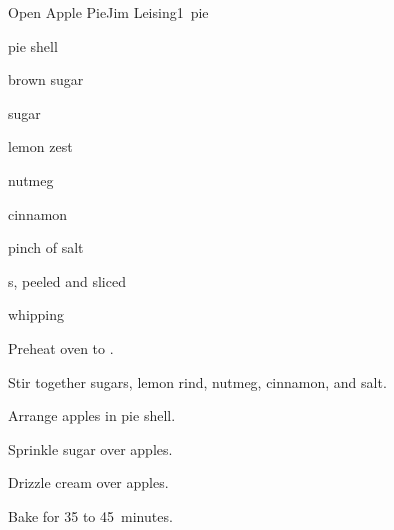 \begin{recipe}{Open Apple Pie}{Jim Leising}{1~pie}

\begin{ingredients}
\item pie shell
\item \C{\half} brown sugar
\item \C{\half} sugar
\item {} lemon zest
\item \tp{\half} nutmeg
\item \tp{\half} cinnamon
\item pinch of salt
\item {} s, peeled and sliced
\item \C{\third} whipping 
\end{ingredients}

\begin{directions}
\item Preheat oven to .
\item Stir together sugars, lemon rind, nutmeg, cinnamon, and salt.
\item Arrange apples in pie shell.
\item Sprinkle sugar over apples.
\item Drizzle cream over apples.
\item Bake for 35 to 45~minutes.
\end{directions}

\end{recipe}
